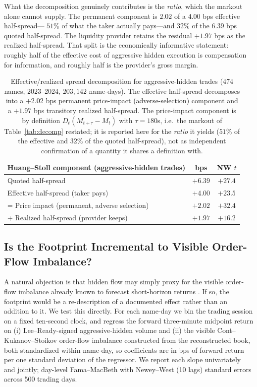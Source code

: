 \documentclass[11pt]{article}
\begin{document}
What the decomposition genuinely contributes is the \emph{ratio}, which the markout alone
cannot supply. The permanent component is $2.02$ of a $4.00$ bps effective half-spread---
$51\%$ of what the taker actually pays---and $32\%$ of the $6.39$ bps quoted half-spread.
The liquidity provider retains the residual $+1.97$ bps as the realized half-spread. That
split is the economically informative statement: roughly half of the effective cost of
aggressive hidden execution is compensation for information, and roughly half is the
provider's gross margin.

\begin{table}[htbp]
\centering
\begin{tabular}{lcc}
\toprule
\textbf{Huang--Stoll component (aggressive-hidden trades)} & \textbf{bps} & \textbf{NW $t$} \\
\midrule
Quoted half-spread & $+6.39$ & $+27.4$ \\
Effective half-spread (taker pays) & $+4.00$ & $+23.5$ \\
\quad = Price impact (permanent, adverse selection) & $+2.02$ & $+32.4$ \\
\quad + Realized half-spread (provider keeps) & $+1.97$ & $+16.2$ \\
\bottomrule
\end{tabular}
\caption{Effective/realized spread decomposition \citep{huangstoll1997} for
aggressive-hidden trades (474 names, 2023--2024, $203{,}142$ name-days). The effective
half-spread decomposes into a $+2.02$ bps permanent price-impact (adverse-selection)
component and a $+1.97$ bps transitory realized half-spread. The price-impact component is
by definition $D_t(M_{t+\tau}-M_t)$ with $\tau=180$s, i.e.\ the markout of
Table~\ref{tab:decomp} restated; it is reported here for the \emph{ratio} it yields
($51\%$ of the effective and $32\%$ of the quoted half-spread), not as independent
confirmation of a quantity it shares a definition with.}
\label{tab:spread}
\end{table}

\subsection{Is the Footprint Incremental to Visible Order-Flow Imbalance?}
\label{sub:ofi}

A natural objection is that hidden flow may simply proxy for the visible order-flow
imbalance already known to forecast short-horizon returns \citep{cont2014}. If so,
the footprint would be a re-description of a documented effect rather than an addition to
it. We test this directly. For each name-day we bin the trading session on a fixed ten-second
clock, and regress the forward three-minute midpoint return on (i) Lee--Ready-signed
aggressive-hidden volume and (ii) the visible Cont--Kukanov--Stoikov order-flow imbalance
constructed from the reconstructed book, both standardized within name-day, so coefficients
are in bps of forward return per one standard deviation of the regressor. We report each
slope univariately and jointly; day-level Fama--MacBeth with Newey--West (10 lags) standard
errors across 500 trading days.
\end{document}
